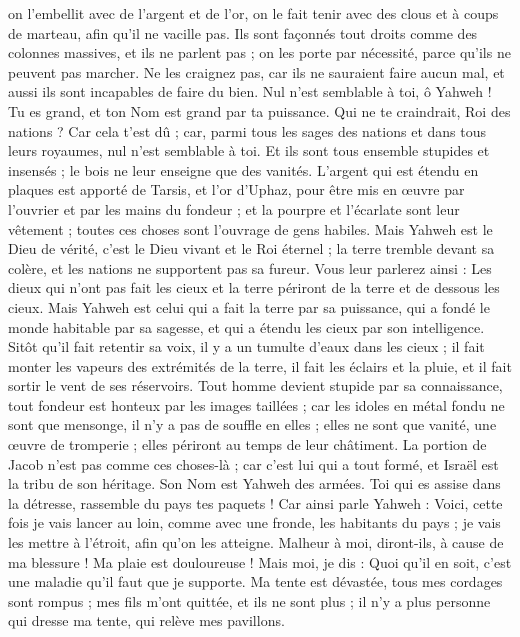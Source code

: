 \begin{multicols}{2}
on l'embellit avec de l'argent et de l'or, on le fait tenir avec des clous et à coups de marteau, afin qu'il ne vacille pas.
Ils sont façonnés tout droits comme des colonnes massives, et ils ne parlent pas ; on les porte par nécessité, parce qu'ils ne peuvent pas marcher. Ne les craignez pas, car ils ne sauraient faire aucun mal, et aussi ils sont incapables de faire du bien.
Nul n'est semblable à toi, ô Yahweh ! Tu es grand, et ton Nom est grand par ta puissance.
Qui ne te craindrait, Roi des nations ? Car cela t'est dû ; car, parmi tous les sages des nations et dans tous leurs royaumes, nul n'est semblable à toi.
Et ils sont tous ensemble stupides et insensés ; le bois ne leur enseigne que des vanités.
L'argent qui est étendu en plaques est apporté de Tarsis, et l'or d'Uphaz, pour être mis en œuvre par l'ouvrier et par les mains du fondeur ; et la pourpre et l'écarlate sont leur vêtement ; toutes ces choses sont l'ouvrage de gens habiles.
Mais Yahweh est le Dieu de vérité, c'est le Dieu vivant et le Roi éternel ; la terre tremble devant sa colère, et les nations ne supportent pas sa fureur.
Vous leur parlerez ainsi : Les dieux qui n'ont pas fait les cieux et la terre périront de la terre et de dessous les cieux.
Mais Yahweh est celui qui a fait la terre par sa puissance, qui a fondé le monde habitable par sa sagesse, et qui a étendu les cieux par son intelligence.
Sitôt qu'il fait retentir sa voix, il y a un tumulte d'eaux dans les cieux ; il fait monter les vapeurs des extrémités de la terre, il fait les éclairs et la pluie, et il fait sortir le vent de ses réservoirs.
Tout homme devient stupide par sa connaissance, tout fondeur est honteux par les images taillées ; car les idoles en métal fondu ne sont que mensonge, il n'y a pas de souffle en elles ;
elles ne sont que vanité, une œuvre de tromperie ; elles périront au temps de leur châtiment.
La portion de Jacob n'est pas comme ces choses-là ; car c'est lui qui a tout formé, et Israël est la tribu de son héritage. Son Nom est Yahweh des armées.
Toi qui es assise dans la détresse, rassemble du pays tes paquets !
Car ainsi parle Yahweh : Voici, cette fois je vais lancer au loin, comme avec une fronde, les habitants du pays ; je vais les mettre à l'étroit, afin qu'on les atteigne.
Malheur à moi, diront-ils, à cause de ma blessure ! Ma plaie est douloureuse ! Mais moi, je dis : Quoi qu'il en soit, c'est une maladie qu'il faut que je supporte.
Ma tente est dévastée, tous mes cordages sont rompus ; mes fils m'ont quittée, et ils ne sont plus ; il n'y a plus personne qui dresse ma tente, qui relève mes pavillons.

\end{multicols}
